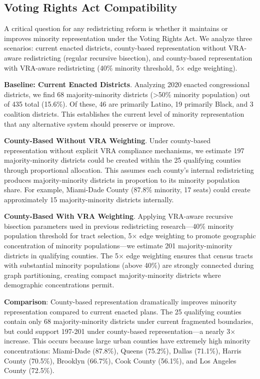 \subsection{Voting Rights Act Compatibility}

A critical question for any redistricting reform is whether it maintains or improves minority representation under the Voting Rights Act. We analyze three scenarios: current enacted districts, county-based representation without VRA-aware redistricting (regular recursive bisection), and county-based representation with VRA-aware redistricting (40\% minority threshold, 5$\times$ edge weighting).

\textbf{Baseline: Current Enacted Districts}. Analyzing 2020 enacted congressional districts, we find 68 majority-minority districts (>50\% minority population) out of 435 total (15.6\%). Of these, 46 are primarily Latino, 19 primarily Black, and 3 coalition districts. This establishes the current level of minority representation that any alternative system should preserve or improve.

\textbf{County-Based Without VRA Weighting}. Under county-based representation without explicit VRA compliance mechanisms, we estimate 197 majority-minority districts could be created within the 25 qualifying counties through proportional allocation. This assumes each county's internal redistricting produces majority-minority districts in proportion to its minority population share. For example, Miami-Dade County (87.8\% minority, 17 seats) could create approximately 15 majority-minority districts internally.

\textbf{County-Based With VRA Weighting}. Applying VRA-aware recursive bisection parameters used in previous redistricting research---40\% minority population threshold for tract selection, 5$\times$ edge weighting to promote geographic concentration of minority populations---we estimate 201 majority-minority districts in qualifying counties. The 5$\times$ edge weighting ensures that census tracts with substantial minority populations (above 40\%) are strongly connected during graph partitioning, creating compact majority-minority districts where demographic concentrations permit.

\textbf{Comparison}: County-based representation dramatically improves minority representation compared to current enacted plans. The 25 qualifying counties contain only 68 majority-minority districts under current fragmented boundaries, but could support 197-201 under county-based representation---a nearly 3$\times$ increase. This occurs because large urban counties have extremely high minority concentrations: Miami-Dade (87.8\%), Queens (75.2\%), Dallas (71.1\%), Harris County (70.5\%), Brooklyn (66.7\%), Cook County (56.1\%), and Los Angeles County (72.5\%).

